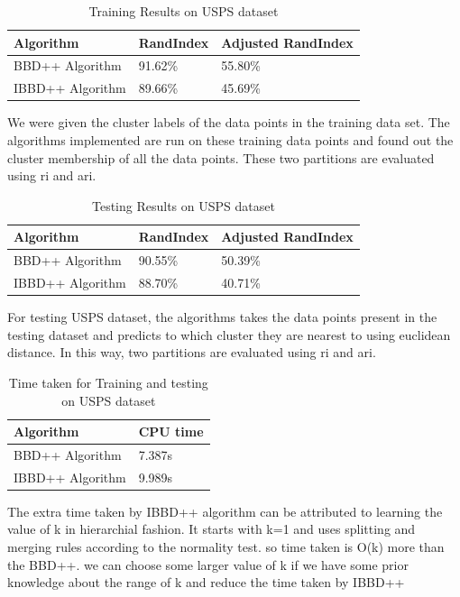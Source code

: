 \documentclass[conference]{IEEEtran}
\begin{document}
\begin{table}[h!]
\centering
\begin{tabular}{ |p{3cm}|p{2cm}|p{2cm}|}
 \hline
Algorithm & RandIndex &Adjusted RandIndex\\
 \hline
 BBD++ Algorithm &  91.62\%   & 55.80\% \\
 IBBD++ Algorithm & 89.66\% & 45.69\% \\
 \hline
\end{tabular}
\hspace{1mm}
\caption{Training Results on USPS dataset}
\label{table:3}
\end{table}

We were given the cluster labels of the data points in the training data set. The algorithms implemented are run on these training data points and found out the cluster membership of all the data points. These two partitions are evaluated using ri and ari.


\begin{table}[h!]
\centering
\begin{tabular}{ |p{3cm}|p{2cm}|p{2cm}|}
 \hline
Algorithm & RandIndex &Adjusted RandIndex\\
 \hline
BBD++ Algorithm &  90.55\%   & 50.39\% \\
IBBD++ Algorithm &  88.70\% & 40.71\% \\
 \hline
\end{tabular}
\hspace{1mm}
\caption{Testing Results on USPS dataset}
\label{table:4}
\end{table}

For testing USPS dataset, the algorithms takes the data points present in the testing dataset and predicts to which cluster they are nearest to using euclidean distance. In this way, two partitions are evaluated using ri and ari.


\begin{table}[h!]
\centering
\begin{tabular}{ |p{3cm}|p{2cm}|}
 \hline
Algorithm & CPU time\\
 \hline
BBD++ Algorithm &  7.387s \\
IBBD++ Algorithm & 9.989s \\
 \hline
\end{tabular}
\hspace{1mm}
\caption{Time taken for Training and testing on USPS dataset}
\label{table:4}
\end{table}
The extra time taken by IBBD++ algorithm can be attributed to learning the value of k in hierarchial fashion. It starts with k=1 and uses splitting and merging rules according to the normality test. so time taken is O(k) more than the BBD++. we can choose some larger value of k if we have some prior knowledge about the range of k and reduce the time taken by IBBD++
\end{document}
